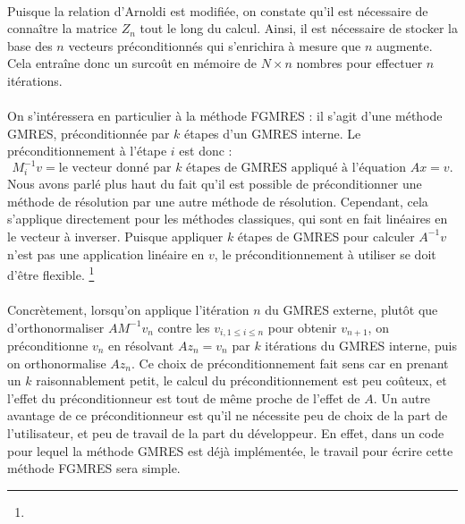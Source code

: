     \paragraph{}
    Puisque la relation d'Arnoldi est modifiée, on constate qu'il est nécessaire de connaître la matrice $Z_n$ tout le long du calcul.
    Ainsi, il est nécessaire de stocker la base des $n$ vecteurs préconditionnés qui s'enrichira à mesure que $n$ augmente.
    Cela entraîne donc un surcoût en mémoire de $N \times n$ nombres pour effectuer $n$ itérations.

    \paragraph{}
    On s'intéressera en particulier à la méthode FGMRES \cite{Saad1993, SimonciniSzyld2002} : il s'agit d'une méthode GMRES, préconditionnée par $k$ étapes d'un GMRES interne.
    Le préconditionnement à l'étape $i$ est donc :
    \[M_i^{-1}v = \textrm{le vecteur donné par $k$ étapes de GMRES appliqué à l'équation $Ax = v$.}\]
    Nous avons parlé plus haut du fait qu'il est possible de préconditionner une méthode de résolution par une autre méthode de résolution.
    Cependant, cela s'applique directement pour les méthodes classiques, qui sont en fait linéaires en le vecteur à inverser.
    Puisque appliquer $k$ étapes de GMRES pour calculer $A^{-1}v$ n'est pas une application linéaire en $v$, le préconditionnement à utiliser se doit d'être flexible.
    \footnote{}

    \paragraph{}
    Concrètement, lorsqu'on applique l'itération $n$ du GMRES externe, plutôt que d'orthonormaliser $AM^{-1}v_n$ contre les $v_{i, 1\leq i\leq n}$ pour obtenir $v_{n+1}$, on préconditionne $v_n$ en résolvant $Az_n = v_n$ par $k$ itérations du GMRES interne, puis on orthonormalise $Az_n$.
    Ce choix de préconditionnement fait sens car en prenant un $k$ raisonnablement petit, le calcul du préconditionnement est peu coûteux, et l'effet du préconditionneur est tout de même proche de l'effet de $A$.
    Un autre avantage de ce préconditionneur est qu'il ne nécessite peu de choix de la part de l'utilisateur, et peu de travail de la part du développeur.
    En effet, dans un code pour lequel la méthode GMRES est déjà implémentée, le travail pour écrire cette méthode FGMRES sera simple.

